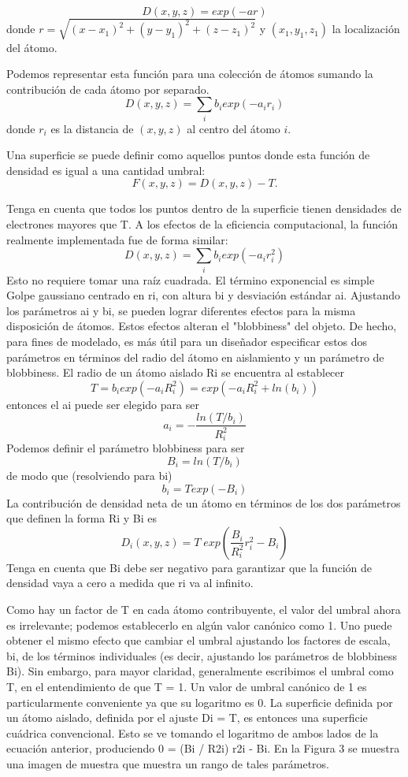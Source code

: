 \[
	D(x, y, z) = exp(-ar)
\]
donde $r = \sqrt{(x-x_1)^2 + (y-y_1)^2 + (z-z_1)^2}$ y $(x_1, y_1, z_1)$ la localización del átomo.

Podemos representar esta función para una colección de átomos sumando la contribución de cada átomo por separado.
\[
	D(x, y, z) = \sum_{i} b_i exp(-a_i r_i)
\]
donde $r_i$ es la distancia de $(x,y,z)$ al centro del átomo $i$.

Una superficie se puede definir como aquellos puntos donde esta función de densidad es igual a una cantidad umbral:
\[
	F ( x, y, z) = D ( x, y, z) - T.
\]

Tenga en cuenta que todos los puntos dentro de la superficie tienen densidades de electrones mayores que T. A los efectos de la eficiencia computacional, la función realmente implementada fue de forma similar:
\[
	D(x, y, z) = \sum_{i} b_i exp(-a_i r^{2}_{i})
\]
Esto no requiere tomar una raíz cuadrada. El término exponencial es simple
Golpe gaussiano centrado en ri, con altura bi y desviación estándar ai. Ajustando los parámetros ai y bi, se pueden lograr diferentes efectos para la misma disposición de átomos. Estos efectos alteran el "blobbiness" del objeto. De hecho, para fines de modelado, es más útil para un diseñador especificar estos dos parámetros en términos del radio del átomo en aislamiento y un parámetro de blobbiness. El radio de un átomo aislado Ri se encuentra al establecer
\[
	T = b_i exp(-a_i R^{2}_{i}) = exp (-a_i R^{2}_{i} + ln (b_i))
\]
entonces el ai puede ser elegido para ser
\[
	a_i = - \frac{ln(T/b_i)}{R^{2}_{i}}
\]
Podemos definir el parámetro blobbiness para ser
\[
	B_i = ln(T/b_i)
\]
de modo que (resolviendo para bi)
\[
	b_i = T exp(-B_i)
\]
La contribución de densidad neta de un átomo en términos de los dos parámetros que definen la forma Ri y Bi es
\[
	D_i(x,y,z) = T \; exp ( \frac{B_i}{R^{2}_{i}}r^{2}_{i} -B_i)
\]
Tenga en cuenta que Bi debe ser negativo para garantizar que la función de densidad vaya a cero a medida que ri va al infinito.

Como hay un factor de T en cada átomo contribuyente, el valor del umbral ahora es irrelevante; podemos establecerlo en algún valor canónico como 1. Uno puede obtener el mismo efecto que cambiar el umbral ajustando los factores de escala, bi, de los términos individuales (es decir, ajustando los parámetros de blobbiness Bi). Sin embargo, para mayor claridad, generalmente escribimos el umbral como T, en el entendimiento de que T = 1. Un valor de umbral canónico de 1 es particularmente conveniente ya que su logaritmo es 0. La superficie definida por un átomo aislado, definida por el ajuste Di = T, es entonces una superficie cuádrica convencional. Esto se ve tomando el logaritmo de ambos lados de la ecuación anterior, produciendo 0 = (Bi / R2i) r2i - Bi. En la Figura 3 se muestra una imagen de muestra que muestra un rango de tales parámetros.

